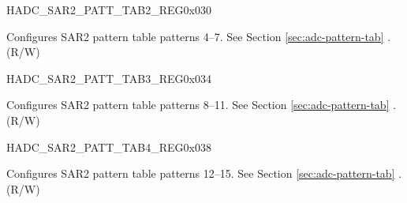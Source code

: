 \begin{register}{H}{ADC\_SAR2\_PATT\_TAB2\_REG}{0x030}\label{regdesc:ADCSAR2PATTTAB2REG}
%
%
\regnewline%
\begin{regdesc}\begin{reglist}
\label{fielddesc:ADCSAR2PATTTAB2}\item [ADC\_SAR2\_PATT\_TAB2] Configures SAR2 pattern table patterns 4--7. See Section \ref{sec:adc-pattern-tab} \textit{}.\\
(R/W)
\end{reglist}\end{regdesc}
\end{register}


\begin{register}{H}{ADC\_SAR2\_PATT\_TAB3\_REG}{0x034}\label{regdesc:ADCSAR2PATTTAB3REG}
%
%
\regnewline%
\begin{regdesc}\begin{reglist}
\label{fielddesc:ADCSAR2PATTTAB3}\item [ADC\_SAR2\_PATT\_TAB3] Configures SAR2 pattern table patterns 8--11. See Section \ref{sec:adc-pattern-tab} \textit{}.\\
(R/W)
\end{reglist}\end{regdesc}
\end{register}


\begin{register}{H}{ADC\_SAR2\_PATT\_TAB4\_REG}{0x038}\label{regdesc:ADCSAR2PATTTAB4REG}
%
%
\regnewline%
\begin{regdesc}\begin{reglist}
\label{fielddesc:ADCSAR2PATTTAB4}\item [ADC\_SAR2\_PATT\_TAB4] Configures SAR2 pattern table patterns 12--15. See Section \ref{sec:adc-pattern-tab} \textit{}.\\
(R/W)
\end{reglist}\end{regdesc}
\end{register}


